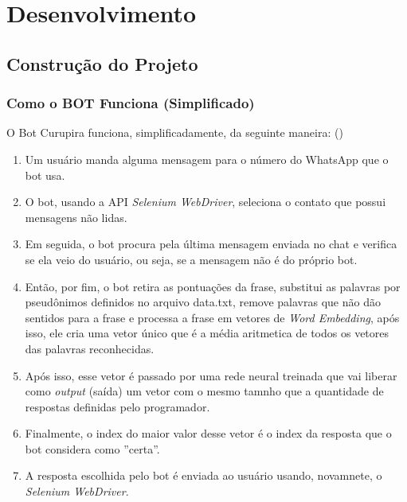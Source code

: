 \chapter{\textbf{Desenvolvimento}}
\section{Construção do Projeto}

\subsection{Como o BOT Funciona (Simplificado)}
    O Bot Curupira funciona, simplificadamente, da seguinte maneira:
    ()
    \begin{enumerate}
        \item Um usuário manda alguma mensagem para o número do WhatsApp que o bot usa.
        
        \item O bot, usando a API \textit{Selenium WebDriver}, seleciona o contato que possui mensagens não lidas.
        
        \item Em seguida, o bot procura pela última mensagem enviada no chat e verifica se ela veio do usuário, ou seja, se a mensagem não é do próprio bot.
        
        \item Então, por fim, o bot retira as pontuações da frase, substitui as palavras por pseudônimos definidos no arquivo data.txt, remove palavras que não dão sentidos para a frase e processa a frase em vetores de \textit{Word Embedding}, após isso, ele cria uma vetor único que é a média aritmetica de todos os vetores das palavras reconhecidas.
        
        \item Após isso, esse vetor é passado por uma rede neural treinada que vai liberar como \textit{output} (saída) um vetor com o mesmo tamnho que a quantidade de respostas definidas pelo programador.
        
        \item Finalmente, o index do maior valor desse vetor é o index da resposta que o bot considera como ''certa''.
        
        \item A resposta escolhida pelo bot é enviada ao usuário usando, novamnete, o \textit{Selenium WebDriver}.
    \end{enumerate}

